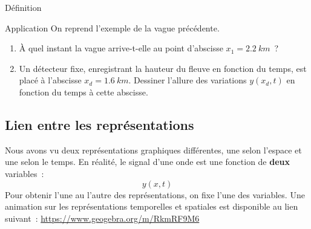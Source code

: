 \documentclass[../main/main.tex]{subfiles}
\begin{document}
\begin{bdefi}{Définition}
\end{bdefi}

\begin{rexem}{Application}
    On reprend l’exemple de la vague précédente.
    \begin{enumerate}
        \item À quel instant la vague arrive-t-elle au point d'abscisse $x_1 =
            \SI{2.2}{km}$~? \smallbreak
        \item Un détecteur fixe, enregistrant la hauteur du fleuve en fonction
            du temps, est placé à l'abscisse $x_d = \SI{1.6}{km}$. Dessiner
            l'allure des variations $y(x_d,t)$ en fonction du temps à cette
            abscisse.
    \end{enumerate}
    {\vspace{2cm}}
\end{rexem}

\subsection{Lien entre les représentations}
Nous avons vu deux représentations graphiques différentes, une selon l'espace et
une selon le temps. En réalité, le signal d'une onde est une fonction de
\textbf{deux} variables~:
\[y(x,t)\]
Pour obtenir l'une au l'autre des représentations, on fixe l'une des variables.
Une animation sur les représentations temporelles et spatiales est disponible au
lien suivant~: \url{https://www.geogebra.org/m/RkmRF9M6}
\end{document}
